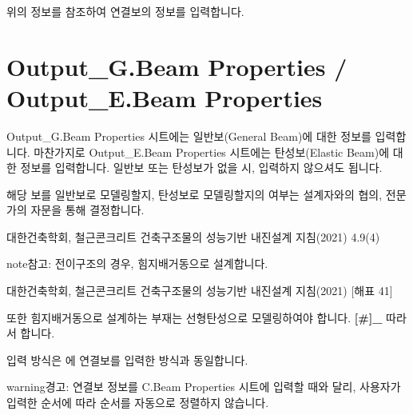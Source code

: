 \documentclass[a4paper,11pt,korean,openany,oneside]{sphinxmanual}
\begin{document}
\begin{sphinxShadowBox}

\sphinxAtStartPar
위의 정보를 참조하여 연결보의 정보를 입력합니다.
\end{sphinxShadowBox}

\sphinxstepscope


\section{Output\_G.Beam Properties / Output\_E.Beam Properties}
\label{\detokenize{2_output_e_g_beam_properties:output-g-beam-properties-output-e-beam-properties}}\label{\detokenize{2_output_e_g_beam_properties::doc}}
\sphinxAtStartPar
Output\_G.Beam Properties 시트에는 일반보(General Beam)에 대한 정보를 입력합니다.
마찬가지로 Output\_E.Beam Properties 시트에는 탄성보(Elastic Beam)에 대한 정보를 입력합니다.
일반보 또는 탄성보가 없을 시, 입력하지 않으셔도 됩니다.

\sphinxAtStartPar
해당 보를 일반보로 모델링할지, 탄성보로 모델링할지의 여부는 설계자와의 협의, 전문가의 자문을 통해 결정합니다. %
\begin{footnote}[1]\sphinxAtStartFootnote
대한건축학회, 철근콘크리트 건축구조물의 성능기반 내진설계 지침(2021) 4.9\sphinxhyphen{}(4)
%
\end{footnote}

\begin{sphinxadmonition}{note}{참고:}
\sphinxAtStartPar
전이구조의 경우, 힘지배거동으로 설계합니다. %
\begin{footnote}[2]\sphinxAtStartFootnote
대한건축학회, 철근콘크리트 건축구조물의 성능기반 내진설계 지침(2021) {[}해표 4\sphinxhyphen{}1{]}
%
\end{footnote}
또한 힘지배거동으로 설계하는 부재는 선형탄성으로 모델링하여야 합니다. {\color{red}\bfseries{}{[}\#{]}\_}
따라서 합니다.
\end{sphinxadmonition}

\sphinxAtStartPar
입력 방식은 {\hyperref[\detokenize{2_c_beam_properties::doc}]{}}에 연결보를 입력한 방식과 동일합니다.

\begin{sphinxadmonition}{warning}{경고:}
\sphinxAtStartPar
연결보 정보를 C.Beam Properties 시트에 입력할 때와 달리, 사용자가 입력한 순서에 따라
순서를 자동으로 정렬하지 않습니다.
\end{sphinxadmonition}
\end{document}
